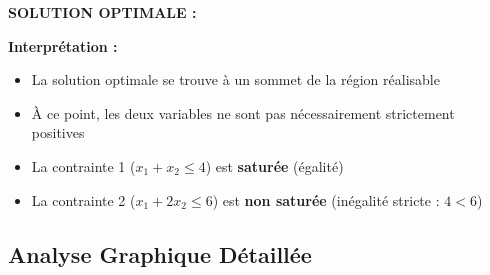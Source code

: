 \documentclass[12pt,a4paper]{article}
\begin{document}
\begin{solution}
\textbf{SOLUTION OPTIMALE :}

\begin{center}
\end{center}

\textbf{Interprétation :}
\begin{itemize}
    \item La solution optimale se trouve à un sommet de la région réalisable
    \item À ce point, les deux variables ne sont pas nécessairement strictement positives
    \item La contrainte 1 ($x_1 + x_2 \leq 4$) est \textcolor{importantrouge}{\textbf{saturée}} (égalité)
    \item La contrainte 2 ($x_1 + 2x_2 \leq 6$) est \textcolor{defvert}{\textbf{non saturée}} (inégalité stricte : $4 < 6$)
\end{itemize}
\end{solution}

\newpage
\subsection{Analyse Graphique Détaillée}
\end{document}
